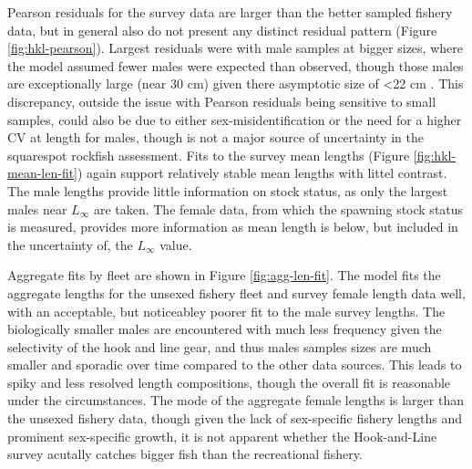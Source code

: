 \documentclass[11pt,
  english,
  a4paper,
]{article}
\begin{document}
Pearson residuals for the survey data are larger than the better sampled fishery data, but in general also do not present any distinct residual pattern (Figure \ref{fig:hkl-pearson}). Largest residuals were with male samples at bigger sizes, where the model assumed fewer males were expected than observed, though those males are exceptionally large (near 30 cm) given there asymptotic size of \textless22 cm . This discrepancy, outside the issue with Pearson residuals being sensitive to small samples, could also be due to either sex-misidentification or the need for a higher CV at length for males, though is not a major source of uncertainty in the squarespot rockfish assessment. Fits to the survey mean lengths (Figure \ref{fig:hkl-mean-len-fit}) again support relatively stable mean lengths with littel contrast. The male lengths provide little information on stock status, as only the largest males near {\(L_{\infty}\)\leavevmode\tagmcend\tagstructend} are taken. The female data, from which the spawning stock status is measured, provides more information as mean length is below, but included in the uncertainty of, the {\(L_{\infty}\)\leavevmode\tagmcend\tagstructend} value.

\leavevmode\tagmcend\tagstructend\par


Aggregate fits by fleet are shown in Figure \ref{fig:agg-len-fit}. The model fits the aggregate lengths for the unsexed fishery fleet and survey female length data well, with an acceptable, but noticeabley poorer fit to the male survey lengths. The biologically smaller males are encountered with much less frequency given the selectivity of the hook and line gear, and thus males samples sizes are much smaller and sporadic over time compared to the other data sources. This leads to spiky and less resolved length compositions, though the overall fit is reasonable under the circumstances. The mode of the aggregate female lengths is larger than the unsexed fishery data, though given the lack of sex-specific fishery lengths and prominent sex-specific growth, it is not apparent whether the Hook-and-Line survey acutally catches bigger fish than the recreational fishery.

\leavevmode\tagmcend\tagstructend\par

\end{document}
